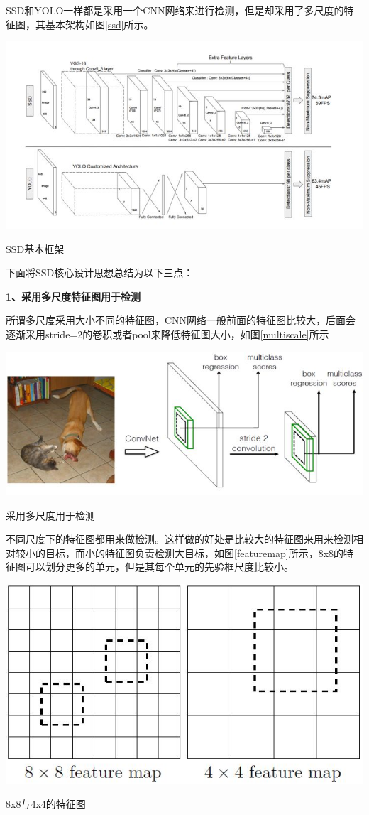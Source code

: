 SSD和YOLO一样都是采用一个CNN网络来进行检测，但是却采用了多尺度的特征图，其基本架构如图\ref{ssd}所示。
\begin{uscfigure}
	\includegraphics[width=\textwidth]{./Pictures/ssd_modual.jpg}	
	\caption{SSD基本框架}
	\label{ssd}
\end{uscfigure}


下面将SSD核心设计思想总结为以下三点：

\textbf{1、采用多尺度特征图用于检测 }

所谓多尺度采用大小不同的特征图，CNN网络一般前面的特征图比较大，后面会逐渐采用stride=2的卷积或者pool来降低特征图大小，如图\ref{multiscale}所示
\begin{uscfigure}
	\includegraphics[width=\textwidth]{./Pictures/ssd_(1).jpg}	
	\caption{采用多尺度用于检测}
	\label{multiscale}
\end{uscfigure}
不同尺度下的特征图都用来做检测。这样做的好处是比较大的特征图来用来检测相对较小的目标，而小的特征图负责检测大目标，如图\ref{featuremap}所示，8x8的特征图可以划分更多的单元，但是其每个单元的先验框尺度比较小。
\begin{uscfigure}
	\includegraphics[width=\textwidth]{./Pictures/ssd_(2).jpg}	
	\caption{8x8与4x4的特征图}
	\label{featuremap}
\end{uscfigure}

